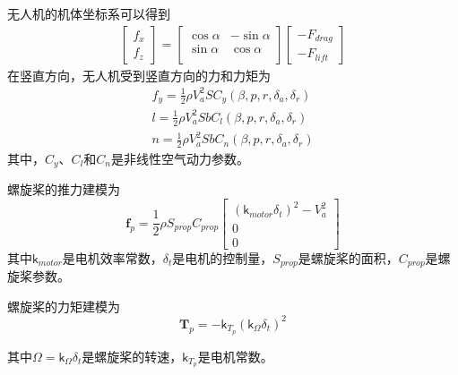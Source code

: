 无人机的机体坐标系可以得到
\begin{align}
\begin{bmatrix} f_x    \\ f_z  \end{bmatrix} = \begin{bmatrix}
\cos \alpha    & - \sin \alpha  \\
\sin \alpha       & \cos \alpha  \\
\end{bmatrix} \begin{bmatrix} -F_{drag}    \\ -F_{lift}  \end{bmatrix}
\end{align}
在竖直方向，无人机受到竖直方向的力和力矩为
\begin{align}
f_y = \frac{1}{2} \rho V_a^2 S C_y (\beta, p, r, \delta_a, \delta_r) \\
l  = \frac{1}{2} \rho V_a^2 S b  C_l (\beta, p, r, \delta_a, \delta_r) \\
n = \frac{1}{2} \rho V_a^2 S b C_n (\beta, p, r, \delta_a, \delta_r)
\end{align}
其中，$C_y$、$C_l$和$C_n$是非线性空气动力参数。

螺旋桨的推力建模为
\begin{equation}
\mathbf{f}_p = \frac{1}{2} \rho S_{prop} C_{prop}  \begin{bmatrix} (\mathsf{k}_{motor} \delta_t)^2 - V_a^2  \\ 0  \\ 0  \end{bmatrix}
\end{equation}
其中$\mathsf{k}_{motor}$是电机效率常数，$\delta_t$是电机的控制量，$S_{prop}$是螺旋桨的面积，$C_{prop}$是螺旋桨参数。

螺旋桨的力矩建模为
\begin{equation}
\mathbf{T}_p = -\mathsf{k}_{T_p} (\mathsf{k}_{\Omega} \delta_{t})^2
\end{equation}

其中$\Omega = \mathsf{k}_{\Omega} \delta_{t}$是螺旋桨的转速，$\mathsf{k}_{T_p}$是电机常数。

